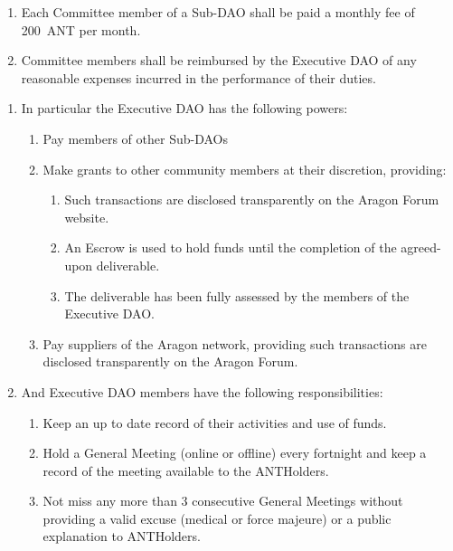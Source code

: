 \begin{enumerate}
\begin{enumerate}
		\begin{enumerate}
			\item Each Committee member of a Sub-\ac{DAO} shall be paid a monthly fee of 200~\ac{ANT} per month.
			\item Committee members shall be reimbursed by the Executive \ac{DAO} of any reasonable expenses incurred in the performance of their duties.
		\end{enumerate}
	
	\end{enumerate}
	
	\begin{enumerate}
		
		\begin{enumerate}
			
			\item In particular the Executive \ac{DAO} has the following powers:
			\begin{enumerate}
				\item Pay members of other Sub-\acp{DAO}
				\item Make grants to other community members at their discretion, providing:
				\begin{enumerate}
					\item Such transactions are disclosed transparently on the Aragon Forum website.
					\item An Escrow is used to hold funds until the completion of the agreed-upon deliverable.
					\item The deliverable has been fully assessed by the members of the Executive \ac{DAO}.
				\end{enumerate}
				\item Pay suppliers of the Aragon network, providing such transactions are disclosed transparently on the Aragon Forum.
			\end{enumerate}
			
			\item And Executive \ac{DAO} members have the following responsibilities:
			\begin{enumerate}
				\item Keep an up to date record of their activities and use of funds.
				\item Hold a General Meeting (online or offline) every fortnight and keep a record of the meeting available to the \glspl{ANTHolder}.
				\item Not miss any more than 3 consecutive General Meetings without providing a valid excuse (medical or force majeure) or a public explanation to \glspl{ANTHolder}.
			\end{enumerate}


\end{enumerate}
\end{enumerate}
\end{enumerate}
